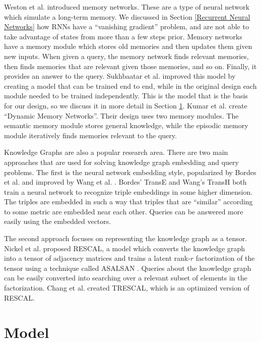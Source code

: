 \documentclass[pageno]{final_paper}
\begin{document}
Weston et al. \cite{Weston2015a} introduced memory networks. These are a type of
neural network which simulate a long-term memory. We discussed in Section
\ref{Recurrent Neural Networks} how RNNs have a ``vanishing gradient'' problem,
and are not able to take advantage of states from more than a few steps prior.
Memory networks have a memory module which stores old memories and then updates
them given new inputs. When given a query, the memory network finds relevant
memories, then finds memories that are relevant given those memories, and so on.
Finally, it provides an answer to the query. Sukhbaatar et al.
\cite{Sukhbaatar2015} improved this model by creating a model that can be
trained end to end, while in the original design each module needed to be
trained independently. This is the model that is the basis for our design, so we
discuss it in more detail in Section \ref{Model}. Kumar et al. \cite{Kumar2015}
create ``Dynamic Memory Networks''. Their design uses two memory modules. The
semantic memory module stores general knowledge, while the episodic memory
module iteratively finds memories relevant to the query.

Knowledge Graphs are also a popular research area. There are two main approaches
that are used for solving knowledge graph embedding and query problems. The
first is the neural network embedding style, popularized by Bordes et al.
\cite{Bordes2013} and improved by Wang et al. \cite{Wang2014}. Bordes' TransE
and Wang's TransH both train a neural network to recognize triple embeddings in
some higher dimension. The triples are embedded in such a way that triples that
are ``similar'' according to some metric are embedded near each other. Queries
can be answered more easily using the embedded vectors.

The second approach focuses on representing the knowledge graph as a tensor.
Nickel et al. \cite{Nickel2011} proposed RESCAL, a model which converts the
knowledge graph into a tensor of adjacency matrices and trains a latent rank-$r$
factorization of the tensor using a technique called ASALSAN \cite{Bader2007}.
Queries about the knowledge graph can be easily converted into searching over a
relevant subset of elements in the factorization. Chang et al. \cite{Chang2014}
created TRESCAL, which is an optimized version of RESCAL.

\section{Model}
\label{Model}
\end{document}
